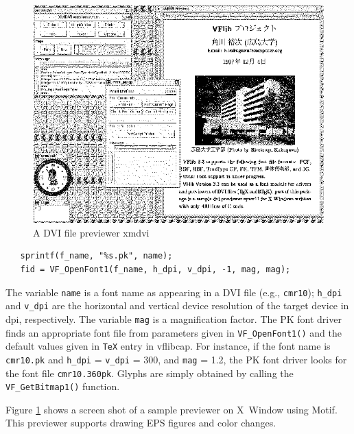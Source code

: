 \documentclass{cah-gut}
\newcommand{\pkg}[1]{\textsf{#1}}
\newcommand{\prog}[1]{\texttt{#1}}
\newcommand{\vflibcap}{\pkg{vflibcap}}
\begin{document}
\begin{figure}
\begin{center}
\mbox{\includegraphics[scale=1.2]{xmdvi-image-bw.eps}}
\end{center}
\caption{A DVI file previewer \pkg{xmdvi}}
\label{FIG:Xmdvi}
\end{figure}

\begin{verbatim}
   sprintf(f_name, "%s.pk", name);
   fid = VF_OpenFont1(f_name, h_dpi, v_dpi, -1, mag, mag);
\end{verbatim}

The variable \prog{name} is a font name as appearing in a DVI file
(e.g., \prog{cmr10}); \prog{h\_dpi} and \prog{v\_dpi} are the
horizontal and vertical device resolution of the target device in dpi,
respectively.  The variable \prog{mag} is a magnification factor.  The
PK font driver finds an appropriate font file from parameters given in
\prog{VF\_OpenFont1()} and the default values given in \prog{TeX} 
entry in \vflibcap. For instance, if the font
name is \prog{cmr10.pk} and \prog{h\_dpi} = \prog{v\_dpi} = 300, and
\prog{mag} = 1.2, the PK font driver looks for the font file
\prog{cmr10.360pk}.  Glyphs are simply obtained by calling the
\prog{VF\_GetBitmap1()} function.

Figure \ref{FIG:Xmdvi} shows a screen shot of a sample previewer on
X~Window using Motif.  This previewer supports drawing EPS figures and
color changes.


\end{document}
